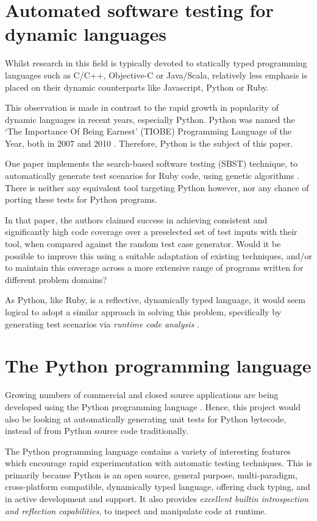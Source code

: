 \section{Automated software testing for dynamic languages}
Whilst research in this field is typically devoted to statically typed programming languages such as C/C++, Objective-C or Java/Scala, relatively less emphasis is placed on their dynamic counterparts like Javascript, Python or Ruby.

This observation is made in contrast to the rapid growth in popularity of dynamic languages in recent years, especially Python. Python was named the `The Importance Of Being Earnest' (TIOBE) Programming Language of the Year, both in 2007 and 2010 \cite{TiobeDec11}. Therefore, Python is the subject of this paper.

One paper implements the search-based software testing (SBST) technique, to automatically generate test scenarios for Ruby code, using genetic algorithms \cite{Mairhofer2011}. There is neither any equivalent tool targeting Python however, nor any chance of porting these tests for Python programs.

In that paper, the authors claimed success in achieving consistent and significantly high code coverage over a preselected set of test inputs with their tool, when compared against the \naive random test case generator. Would it be possible to improve this using a suitable adaptation of existing techniques, and/or to maintain this coverage across a more extensive range of programs written for different problem domains?

As Python, like Ruby, is a reflective, dynamically typed language, it would seem logical to adopt a similar approach in solving this problem, specifically by generating test scenarios via \emph{runtime code analysis} \cite{Mairhofer2011}.
\section{The Python programming language}
Growing numbers of commercial and closed source applications are being developed using the Python programming language \cite{Smith2011}. Hence, this project would also be looking at automatically generating unit tests for Python bytecode, instead of from Python source code traditionally.

The Python programming language contains a variety of interesting features which encourage rapid experimentation with automatic testing techniques. This is primarily because Python is an open source, general purpose, multi-paradigm, cross-platform compatible, dynamically typed language, offering duck typing, and in active development and support. It also provides \emph{excellent builtin introspection and reflection capabilities}, to inspect and manipulate code at runtime.

